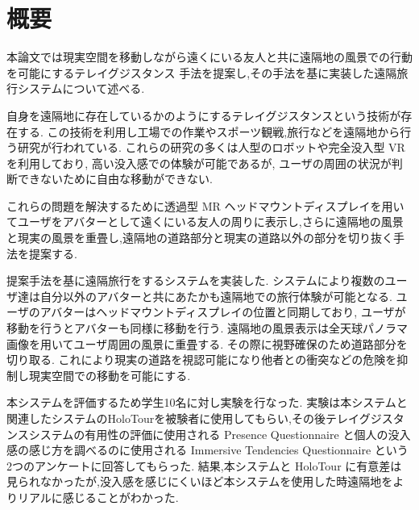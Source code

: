 \section{概要}
本論文では現実空間を移動しながら遠くにいる友人と共に遠隔地の風景での行動を可能にするテレイグジスタンス 手法を提案し,その手法を基に実装した遠隔旅行システムについて述べる.

自身を遠隔地に存在しているかのようにするテレイグジスタンスという技術が存在する. この技術を利用し工場での作業やスポーツ観戦,旅行などを遠隔地から行う研究が行われている. これらの研究の多くは人型のロボットや完全没入型 VR を利用しており, 高い没入感での体験が可能であるが, ユーザの周囲の状況が判断できないために自由な移動ができない. 

これらの問題を解決するために透過型 MR ヘッドマウントディスプレイを用いてユーザをアバターとして遠くにいる友人の周りに表示し,さらに遠隔地の風景と現実の風景を重畳し,遠隔地の道路部分と現実の道路以外の部分を切り抜く手法を提案する. 

提案手法を基に遠隔旅行をするシステムを実装した.
システムにより複数のユーザ達は自分以外のアバターと共にあたかも遠隔地での旅行体験が可能となる. ユーザのアバターはヘッドマウントディスプレイの位置と同期しており, ユーザが移動を行うとアバターも同様に移動を行う. 遠隔地の風景表示は全天球パノラマ画像を用いてユーザ周囲の風景に重畳する. その際に視野確保のため道路部分を切り取る. これにより現実の道路を視認可能になり他者との衝突などの危険を抑制し現実空間での移動を可能にする.

本システムを評価するため学生10名に対し実験を行なった.
実験は本システムと関連したシステムのHoloTourを被験者に使用してもらい,その後テレイグジスタンスシステムの有用性の評価に使用される Presence Questionnaire と個人の没入感の感じ方を調べるのに使用される Immersive Tendencies Questionnaire という2つのアンケートに回答してもらった.
結果,本システムと HoloTour に有意差は見られなかったが,没入感を感じにくいほど本システムを使用した時遠隔地をよりリアルに感じることがわかった.　